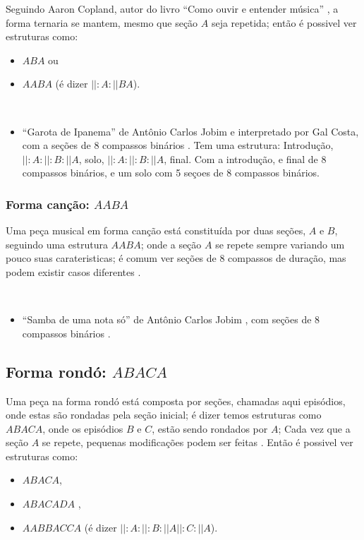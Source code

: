 Seguindo  Aaron Copland, autor do livro ``Como ouvir e entender música'' \cite[pp. 89]{copland1974ouvir},
a forma ternaria se mantem, mesmo que seção $A$ seja repetida;
então é possivel ver estruturas como: 
\begin{itemize}
\item $ABA$ ou
\item $AABA$ (é dizer $||:A:||BA$).
\end{itemize}

\begin{example} ~
\begin{itemize}
\item ``Garota de Ipanema'' de Antônio Carlos Jobim e interpretado por Gal Costa,
com a seções de 8 compassos binários \cite{partituragarotaipanema1} \cite{partituragarotaipanema2}.
Tem uma estrutura: Introdução, $||:A:||:B:||A$, solo,  $||:A:||:B:||A$, final.
Com a introdução, e final de 8 compassos binários, 
e um solo com 5 seçoes de 8 compassos binários.
\end{itemize}
\end{example}

\subsubsection{Forma canção: $AABA$}
\label{subsec:formacancao}
Uma peça musical em forma canção está constituída por duas seções, $A$ e $B$,
seguindo uma estrutura $AABA$; 
onde a seção $A$ se repete sempre variando um pouco suas carateristicas;
é comum ver seções de 8 compassos de duração, mas podem existir casos diferentes
\cite[pp. 53]{colluraimprovisacao} \cite[pp. 16]{adolfo1997composicao}.
\begin{example} ~
\begin{itemize}
\item ``Samba de uma nota só'' de Antônio Carlos Jobim \cite[pp. 53]{colluraimprovisacao} \cite[pp. 16]{adolfo1997composicao},
com seções de 8 compassos binários \cite{partiturasambadeumanotaso1}.
\end{itemize}
\end{example}

\subsection{Forma rondó: $ABACA$}
\label{subsec:formarondo}
Uma peça na forma rondó está composta por seções, 
chamadas aqui episódios, onde estas são rondadas pela seção inicial;
é dizer temos estruturas como $ABACA$, onde os episódios $B$ e $C$,
estão sendo rondados por $A$;
Cada vez que a seção $A$ se repete, 
pequenas modificações podem ser feitas \cite[pp. 72]{bennett1993elementos}.
Então é possivel ver estruturas como: 
\begin{itemize}
\item $ABACA$,
\item $ABACADA$ \cite[pp. 98]{copland1974ouvir},
\item $AABBACCA$ (é dizer $||:A:||:B:||A||:C:||A$).
\end{itemize}

